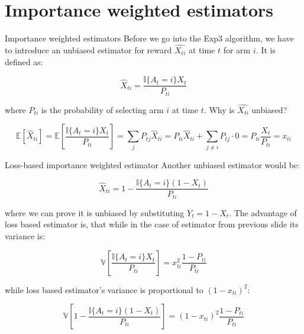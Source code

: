 \documentclass[aspectratio=169,xcolor=dvipsnames]{beamer}
\begin{document}
\section{Importance weighted estimators}
\begin{frame}{Importance weighted estimators}
    Before we go into the Exp3 algorithm, we have to introduce an unbiased estimator for reward $\hat{X_{ti}}$ at time $t$ for arm $i$. It is defined as:

    \begin{equation}
        \hat{X}_{ti} = \frac{\mathbb{I}\{A_t = i\}X_t}{P_{ti}}
    \end{equation}

    where $P_{ti}$ is the probability of selecting arm $i$ at time $t$. Why is $\hat{X_{ti}}$ unbiased?

    \begin{equation}
        \mathbb{E}\left[ \hat{X}_{ti} \right] = \mathbb{E} \left[ \frac{\mathbb{I}\{A_t = i\}X_t}{P_{ti}} \right] = \sum_j P_{tj} \hat{X}_{ti} = P_{ti} \hat{X}_{ti} + \sum_{j \neq i} P_{tj} \cdot 0 = P_{ti} \frac{X_t}{P_{ti}} = x_{ti}
    \end{equation}
\end{frame}

\begin{frame}{Loss-based importance weighted estimator}
    Another unbiased estimator would be:

    \begin{equation}
        \hat{X}_{ti} = 1 - \frac{\mathbb{I}\{A_t = i\}(1 - X_t)}{P_{ti}} 
    \end{equation}

    where we can prove it is unbiased by substituting $Y_t = 1 - X_t$. The advantage of loss based estimator is, that while in the case of estimator from previous slide its variance is:

    \begin{equation}
        \mathbb{V}\left[ \frac{\mathbb{I}\{A_t = i\}X_t}{P_{ti}} \right] = x^2_{ti} \frac{1-P_{ti}}{P_{ti}}
    \end{equation}

    while loss based estimator's variance is proportional to $(1 - x_{ti})^2$:

    \begin{equation}
        \mathbb{V}\left[ 1 - \frac{\mathbb{I}\{A_t = i\}(1 - X_t)}{P_{ti}}  \right] = (1 - x_{ti})^2 \frac{1-P_{ti}}{P_{ti}}
    \end{equation}
\end{frame}
\end{document}
